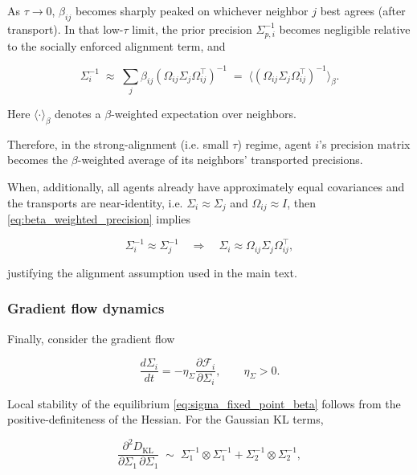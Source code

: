 \documentclass[twoside,11pt]{article}
\begin{document}
As $\tau \to 0$, $\beta_{ij}$ becomes sharply peaked on whichever neighbor $j$ best agrees (after transport). In that low-$\tau$ limit, the prior precision $\Sigma_{p,i}^{-1}$ becomes negligible relative to the socially enforced alignment term, and

\begin{equation}
\boxed{
\Sigma_i^{-1}
\;\approx\;
\sum_j \beta_{ij}
(\Omega_{ij}\Sigma_j\Omega_{ij}^\top)^{-1}
\;=\;\big\langle(\Omega_{ij}\Sigma_j\Omega_{ij}^\top)^{-1}
\big\rangle_{\beta}.}
\label{eq:beta_weighted_precision}
\end{equation}

Here $\langle \cdot \rangle_{\beta}$ denotes a $\beta$-weighted expectation over neighbors.

Therefore, in the strong-alignment (i.e. small $\tau$) regime, agent $i$'s precision matrix becomes the $\beta$-weighted average of its neighbors' transported precisions.

When, additionally, all agents already have approximately equal covariances and the transports are near-identity, i.e. $\Sigma_i \approx \Sigma_j$ and $\Omega_{ij} \approx I$, then \eqref{eq:beta_weighted_precision} implies

\begin{equation}
\Sigma_i^{-1} \approx \Sigma_j^{-1}
\quad\Longrightarrow\quad
\Sigma_i \approx \Omega_{ij}\Sigma_j\Omega_{ij}^\top,
\end{equation}

justifying the alignment assumption used in the main text.

\subsubsection{Gradient flow dynamics}

Finally, consider the gradient flow

\begin{equation}
\frac{d\Sigma_i}{dt}
=-\eta_\Sigma
\frac{\partial \mathcal{F}_i}{\partial \Sigma_i},
\qquad\eta_\Sigma > 0.
\end{equation}

Local stability of the equilibrium \eqref{eq:sigma_fixed_point_beta} follows from the positive-definiteness of the Hessian. For the Gaussian KL terms,

\begin{equation}
\frac{\partial^2 D_{\mathrm{KL}}}{\partial \Sigma_1 \, \partial \Sigma_1}
\;\sim\;
\Sigma_1^{-1} \otimes \Sigma_1^{-1}
+ \Sigma_2^{-1} \otimes \Sigma_2^{-1},
\end{equation}
\end{document}
